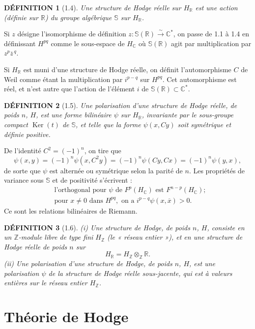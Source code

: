 \documentclass[10pt]{article}
\newcommand{\C}{\mathbb C}
\newcommand{\R}{\mathbb R}
\newcommand{\Z}{\mathbb Z}
\newcommand{\bS}{\mathbb S}
\newcommand{\Ker}{\operatorname{Ker}}
\theoremstyle{deligne}
\newtheorem*{definition}{DÉFINITION}
\begin{document}
\begin{definition}[1.4]
Une structure de Hodge réelle sur $H_\R$ est une action (définie sur $\R$) du groupe algébrique $\bS$ sur $H_\R$.
\end{definition}

Si $z$ désigne l'isomorphisme de définition $z:\bS(\R)\xrightarrow{\sim}\C^*$, on passe de 1.1 à 1.4 en définissant $H^{pq}$ comme le sous-espace de $H_\C$ où $\bS(\R)$ agit par multiplication par $z^p\overline z^{\,q}$.

Si $H_\R$ est muni d'une structure de Hodge réelle, on définit l'automorphisme $C$ de Weil comme étant la multiplication par $i^{p-q}$ sur $H^{pq}$. Cet automorphisme est réel, et n'est autre que l'action de l'élément $i$ de $\bS(\R)\subset\C^*$.

\begin{definition}[1.5]
Une polarisation d'une structure de Hodge réelle, de poids $n$, $H$, est une forme bilinéaire $\psi$ sur $H_\R$, invariante par le sous-groupe compact $\Ker(t)$ de $\bS$, et telle que la forme $\psi(x,Cy)$ soit symétrique et définie positive.
\end{definition}

De l'identité $C^2=(-1)^n$, on tire que
\[
\psi(x,y)=(-1)^n\psi(x,C^2y)=(-1)^n\psi(Cy,Cx)=(-1)^n\psi(y,x),
\]
de sorte que $\psi$ est alternée ou symétrique selon la parité de $n$. Les propriétés de variance sous $\bS$ et de positivité s'écrivent :
\begin{align}
&\text{l'orthogonal pour }\psi\text{ de }F^p(H_\C)\text{ est }F^{n-p}(H_\C);\tag{1.5.1}\\
&\text{pour }x\ne0\text{ dans }H^{pq},\text{ on a } i^{p-q}\psi(x,\overline x)>0.\tag{1.5.2}
\end{align}
Ce sont les relations bilinéaires de Riemann.

\begin{definition}[1.6]
(i) Une structure de Hodge, de poids $n$, $H$, consiste en un $\Z$-module libre de type fini $H_\Z$ (le « réseau entier »), et en une structure de Hodge réelle de poids $n$ sur
\[
H_\R=H_\Z\otimes_\Z\R .
\]
(ii) Une polarisation d'une structure de Hodge, de poids $n$, $H$, est une polarisation $\psi$ de la structure de Hodge réelle sous-jacente, qui est à valeurs entières sur le réseau entier $H_\Z$.
\end{definition}

\section{Théorie de Hodge}
\end{document}
